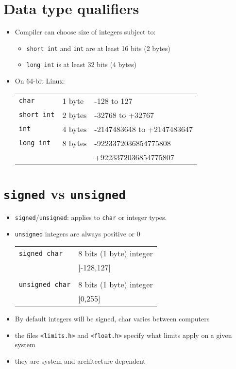 \documentclass{article}
\begin{document}
\section{Data type qualifiers}
\begin{itemize}
\item Compiler can choose size of integers subject to:
\begin{itemize}
\item \verb!short int! and \verb!int! are at least 16 bits (2 bytes)
\item \verb!long int! is at least 32 bits (4 bytes)
\end{itemize}
\item On 64-bit Linux:
\begin{tabular}{lll}
\verb!char! & 1 byte & -128 to 127\\
\verb!short int! & 2 bytes & -32768 to +32767\\
\verb!int! & 4 bytes & -2147483648 to +2147483647\\
\verb!long int! & 8 bytes & -9223372036854775808\\
& & +9223372036854775807
\end{tabular}
\end{itemize}



\section{\texttt{signed} vs \texttt{unsigned}}
\begin{itemize}
\item \verb!signed!/\verb!unsigned!: applies to \verb!char! or integer types.
\item \verb!unsigned! integers are always positive or 0
\begin{tabular}{ll}
\verb!signed char! & 8 bits (1 byte) integer\\
& [-128,127]\\
\\
\verb!unsigned char! & 8 bits (1 byte) integer\\
& [0,255]\\
\end{tabular}
\item By default integers will be signed, char varies between computers
\item the files \verb!<limits.h>! and \verb!<float.h>! specify what limits apply on a given system
\item they are system and architecture dependent
\end{itemize}
\end{document}
